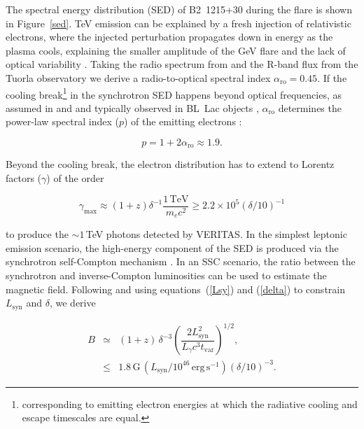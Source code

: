 \documentclass[twocolumn]{aastex6}
\def\b2{B2~1215+30}
\begin{document}
The spectral energy distribution (SED) of \b2 during the flare is shown in Figure~\ref{sed}.  TeV emission can be explained by a fresh injection of relativistic electrons, where the injected perturbation propagates down in energy as the plasma cools, explaining the smaller amplitude of the GeV flare and the lack of optical variability \citep[see, e.g., ][]{2007A&A...462...29G}. 
Taking the radio spectrum from \citet{2004MNRAS.352..673A} and the R-band flux from the Tuorla  observatory we derive a radio-to-optical spectral index $\alpha_\mathrm{ro} =0.45$. 
If the cooling break\footnote{corresponding to emitting electron energies at which the radiative cooling and escape timescales are equal.} in the synchrotron SED happens beyond optical frequencies, as assumed in \citet{magic_1215} and \citet{veritas_1215} and typically observed in BL~Lac objects \citep{2010MNRAS.401.1570T}, $\alpha_\mathrm{ro}$ determines the power-law spectral index ($p$) of the emitting electrons \citep[see, e.g.,][]{1979rpa..book.....R}:
\begin{linenomath}
\begin{equation}
p=1+2\alpha_\mathrm{ro}\approx 1.9.
\label{p}
\end{equation}
\end{linenomath}
%
Beyond the cooling break, the electron distribution has to extend to Lorentz factors ($\gamma$) of the order
\begin{linenomath}
\begin{equation}
\gamma_\mathrm{max} \approx \left( 1+z\right) \delta^{-1} \dfrac{1\,\mathrm{TeV}}{m_e c^2} \geqslant 2.2 \times 10^5 \left(\delta/10\right)^{-1}
\label{gmax}
\end{equation}
\end{linenomath}
to produce the $\sim 1$\,TeV photons detected by VERITAS. In the simplest leptonic emission scenario, the high-energy component of the SED is produced via the synchrotron self-Compton mechanism \citep[SSC;][]{1992ApJ...397L...5M}. In an SSC scenario, the ratio between the synchrotron and inverse-Compton luminosities can be used to estimate the magnetic field. Following \citet{1996A&AS..120C.503G} and using equations~(\ref{Lsy}) and (\ref{delta}) to constrain  $L_\mathrm{syn}$ and $\delta$, we derive
\begin{linenomath}
\begin{eqnarray}
B &\simeq& \left(1+z \right)\, \delta^{-3}\left(\dfrac{2L_\mathrm{syn}^2}{L_\gamma c^3 t_\mathrm{var}}\right)^{1/2}, \nonumber \\
&\leqslant& 1.8\,\mathrm{G}\,\left( L_\mathrm{syn}/10^{46}\,\mathrm{erg\,s^{-1}}\right) \left(\delta/10\right)^{-3}.
\label{B}
\end{eqnarray}
\end{linenomath}
\end{document}
